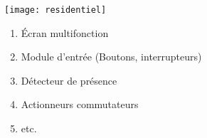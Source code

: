 \begin{UPSTIactivite}
	\begin{center}
		\texttt{[image: residentiel]}
	\end{center}
    \begin{multicols}{2}
		\begin{enumerate}
			\item Écran multifonction 
            \item Module d'entrée (Boutons, interrupteurs)
			\item Détecteur de présence
			\item Actionneurs commutateurs
			\item etc. 
		\end{enumerate}
	\end{multicols}
\end{UPSTIactivite}


